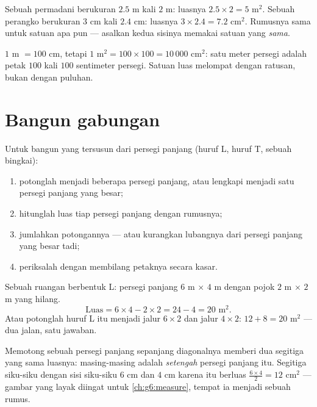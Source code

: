 \begin{example}\label{ex:g5:areas:rectangle}
Sebuah permadani berukuran $2.5$ m kali $2$ m: luasnya
$2.5 \times 2 = 5$ m$^2$. Sebuah perangko berukuran $3$ cm kali
$2.4$ cm: luasnya $3 \times 2.4 = 7.2$ cm$^2$. Rumusnya sama untuk
satuan apa pun --- asalkan kedua sisinya memakai satuan yang
\emph{sama}.
\end{example}

\begin{example}\label{ex:g5:areas:units}
$1$ m $= 100$ cm, tetapi $1$ m$^2 = 100 \times 100 = 10\,000$ cm$^2$:
satu meter persegi adalah petak $100$ kali $100$ sentimeter persegi.
Satuan luas melompat dengan ratusan, bukan dengan puluhan.
\end{example}

\section{Bangun gabungan}

\begin{method}\label{met:g5:areas:composite}
Untuk bangun yang tersusun dari persegi panjang (huruf L, huruf T, sebuah bingkai):
\begin{enumerate}
  \item potonglah menjadi beberapa persegi panjang, atau lengkapi
        menjadi satu persegi panjang yang besar;
  \item hitunglah luas tiap persegi panjang dengan rumusnya;
  \item jumlahkan potongannya --- atau kurangkan lubangnya dari
        persegi panjang yang besar tadi;
  \item periksalah dengan membilang petaknya secara kasar.
\end{enumerate}
\end{method}

\begin{example}\label{ex:g5:areas:composite}
Sebuah ruangan berbentuk L: persegi panjang $6$ m $\times$ $4$ m
dengan pojok $2$ m $\times$ $2$ m yang hilang.
\[
\text{Luas} = 6 \times 4 - 2 \times 2 = 24 - 4 = 20 \text{ m}^2 .
\]
Atau potonglah huruf L itu menjadi jalur $6 \times 2$ dan jalur
$4 \times 2$: $12 + 8 = 20$ m$^2$ --- dua jalan, satu jawaban.
\end{example}

\begin{example}\label{ex:g5:areas:halfrect}
Memotong sebuah persegi panjang sepanjang diagonalnya memberi dua
segitiga yang sama luasnya: masing-masing adalah \emph{setengah} persegi
panjang itu. Segitiga siku-siku dengan sisi siku-siku $6$ cm dan
$4$ cm karena itu berluas $\frac{6 \times 4}{2} = 12$ cm$^2$ ---
gambar yang layak diingat untuk \cref{ch:g6:measure}, tempat ia
menjadi sebuah rumus.
\end{example}

